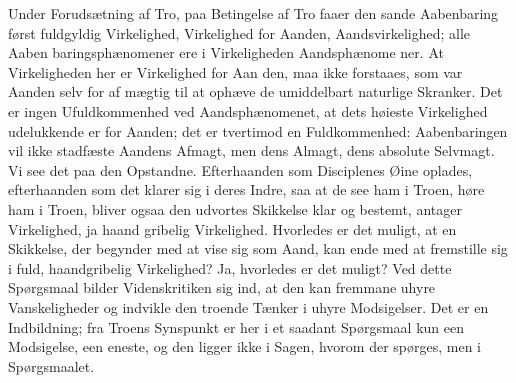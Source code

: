 \documentclass[12pt]{book}
\newcommand{\opage}[1]{\marginnote{\footnotesize\textit{[#1]}}}
\begin{document}
Under Forudsætning af Tro, paa Betingelse af Tro
faaer den sande Aabenbaring først fuldgyldig Virkelighed,
Virkelighed for Aanden, Aandsvirkelighed; alle Aaben\-%
\opage{173}\setcounter{footnote}{0}%
baringsphænomener ere i Virkeligheden Aandsphænome\-%
ner. At Virkeligheden her er Virkelighed for Aan\-%
den, maa ikke forstaaes, som var Aanden selv for af\-%
mægtig til at ophæve de umiddelbart naturlige Skranker.
Det er ingen Ufuldkommenhed ved Aandsphænomenet,
at dets høieste Virkelighed udelukkende er for Aanden;
det er tvertimod en Fuldkommenhed: Aabenbaringen vil
ikke stadfæste Aandens Afmagt, men dens Almagt, dens
absolute Selvmagt. Vi see det paa den Opstandne.
Efterhaanden som Disciplenes Øine oplades, efterhaanden
som det klarer sig i deres Indre, saa at de see ham i
Troen, høre ham i Troen, bliver ogsaa den udvortes
Skikkelse klar og bestemt, antager Virkelighed, ja haand\-%
gribelig Virkelighed. Hvorledes er det muligt, at en
Skikkelse, der begynder med at vise sig som Aand,
kan ende med at fremstille sig i fuld, haandgribelig
Virkelighed? Ja, hvorledes er det muligt? Ved dette
Spørgsmaal bilder Videnskritiken sig ind, at den kan
fremmane uhyre Vanskeligheder og indvikle den troende
Tænker i uhyre Modsigelser. Det er en Indbildning; fra
Troens Synspunkt er her i et saadant Spørgsmaal kun
een Modsigelse, een eneste, og den ligger ikke i Sagen,
hvorom der spørges, men i Spørgsmaalet.
\end{document}
